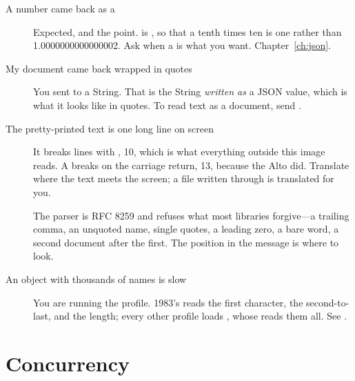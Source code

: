 \begin{description}
\item[A number came back as a ] Expected, and the point.
   is , so that a tenth times ten is one rather than
  1.0000000000000002. Ask  when a  is what you want.
  Chapter~\ref{ch:json}.
\item[My document came back wrapped in quotes] You sent  to
  a String. That is the String \emph{written as} a JSON value, which is what
  it looks like in quotes. To read text as a document, send .
\item[The pretty-printed text is one long line on screen] It breaks lines with
  , 10, which is what everything outside this image reads.
  A  breaks on the carriage return, 13, because the Alto did.
  Translate where the text meets the screen; a file written through
   is translated for you.
\item[] The parser is
  RFC 8259 and refuses what most libraries forgive---a trailing comma, an
  unquoted name, single quotes, a leading zero, a bare word, a second document
  after the first. The position in the message is where to look.
\item[An object with thousands of names is slow] You are running the
   profile. 1983's  reads the first character,
  the second-to-last, and the length; every other profile loads
  , whose  reads them all. See
  .
\end{description}

\section{Concurrency}

